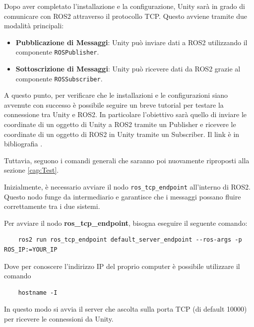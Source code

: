 \documentclass[11pt]{report}
\begin{document}

Dopo aver completato l’installazione e la configurazione, Unity sarà in grado di comunicare con ROS2 attraverso il protocollo TCP. Questo avviene tramite due modalità principali:
    
\begin{itemize}
    \item \textbf{Pubblicazione di Messaggi}: Unity può inviare dati a ROS2 utilizzando il componente \texttt{ROSPublisher}.
    \item \textbf{Sottoscrizione di Messaggi}: Unity può ricevere dati da ROS2 grazie al componente \texttt{ROSSubscriber}.
\end{itemize}

A questo punto, per verificare che le installazioni e le configurazioni siano avvenute con successo è possibile seguire un breve tutorial per testare la connessione tra Unity e ROS2.
In particolare l'obiettivo sarà quello di inviare le coordinate di un oggetto di Unity a ROS2 tramite un Publisher e ricevere le coordinate di un oggetto di ROS2 in Unity tramite un Subscriber. Il link è in bibliografia \cite{Test-Connessione-ROS-Unity}.

Tuttavia, seguono i comandi generali che saranno poi nuovamente riproposti alla sezione \ref{cap:Test}.

Inizialmente, è necessario avviare il nodo \texttt{ros\_tcp\_endpoint} all’interno di ROS2. Questo nodo funge da intermediario e garantisce che i messaggi possano fluire correttamente tra i due sistemi.
    
Per avviare il nodo \textbf{ros\_tcp\_endpoint}, bisogna eseguire il seguente comando:

\begin{verbatim}
    ros2 run ros_tcp_endpoint default_server_endpoint --ros-args -p ROS_IP:=YOUR_IP
\end{verbatim}

Dove per conoscere l'indirizzo IP del proprio computer è possibile utilizzare il comando 
\begin{verbatim}
    hostname -I
\end{verbatim}

In questo modo si avvia il server che ascolta sulla porta TCP (di default 10000) per ricevere le connessioni da Unity.
\end{document}

